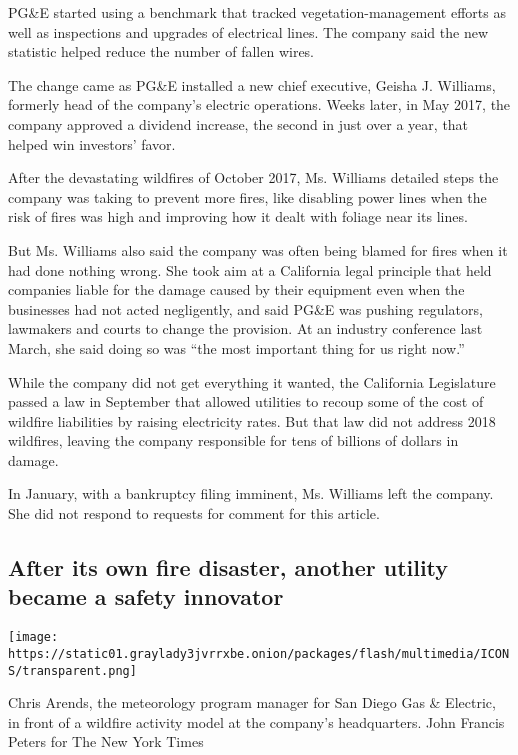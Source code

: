 PG\&E started using a benchmark that tracked vegetation-management
efforts as well as inspections and upgrades of electrical lines. The
company said the new statistic helped reduce the number of fallen wires.

The change came as PG\&E installed a new chief executive, Geisha J.
Williams, formerly head of the company's electric operations. Weeks
later, in May 2017, the company approved a dividend increase, the second
in just over a year, that helped win investors' favor.

After the devastating wildfires of October 2017, Ms. Williams detailed
steps the company was taking to prevent more fires, like disabling power
lines when the risk of fires was high and improving how it dealt with
foliage near its lines.

But Ms. Williams also said the company was often being blamed for fires
when it had done nothing wrong. She took aim at a California legal
principle that held companies liable for the damage caused by their
equipment even when the businesses had not acted negligently, and said
PG\&E was pushing regulators, lawmakers and courts to change the
provision. At an industry conference last March, she said doing so was
``the most important thing for us right now.''

While the company did not get everything it wanted, the California
Legislature passed a law in September that allowed utilities to recoup
some of the cost of wildfire liabilities by raising electricity rates.
But that law did not address 2018 wildfires, leaving the company
responsible for tens of billions of dollars in damage.

In January, with a bankruptcy filing imminent, Ms. Williams left the
company. She did not respond to requests for comment for this article.

\hypertarget{after-its-own-fire-disaster-another-utility-became-a-safety-innovator}{%
\subsection{After its own fire disaster, another utility became a safety
innovator}\label{after-its-own-fire-disaster-another-utility-became-a-safety-innovator}}

\texttt{[image: https://static01.graylady3jvrrxbe.onion/packages/flash/multimedia/ICONS/transparent.png]}

Chris Arends, the meteorology program manager for San Diego Gas \&
Electric, in front of a wildfire activity model at the company's
headquarters. John Francis Peters for The New York Times

